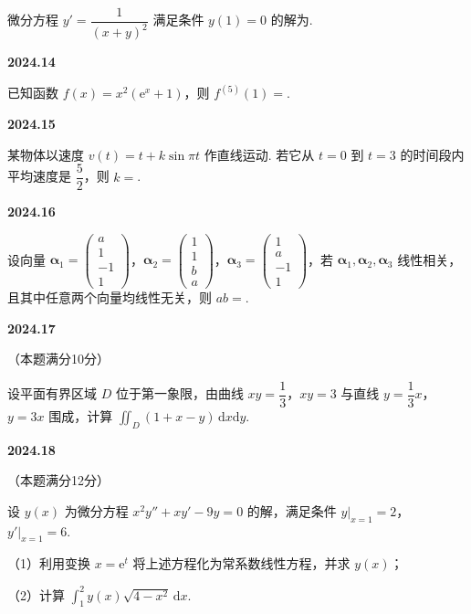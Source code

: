 \documentclass[UTF8,12pt,fontset=windows]{ctexart}
\begin{document}
微分方程 $y'=\dfrac{1}{(x+y)^2}$ 满足条件 $y(1)=0$ 的解为\underline{\hspace{20mm}}.

\vfill
\newpage
{\large\bfseries 2024.14}

已知函数 $f(x)=x^2(\mathrm{e}^x+1)$，则 $f^{(5)}(1)=$\underline{\hspace{20mm}}.

\vfill
\newpage
{\large\bfseries 2024.15}

某物体以速度 $v(t)=t+k\sin\pi t$ 作直线运动. 若它从 $t=0$ 到 $t=3$ 的时间段内平均速度是 $\dfrac{5}{2}$，则 $k=$\underline{\hspace{20mm}}.

\vfill
\newpage
{\large\bfseries 2024.16}

设向量 $\boldsymbol{\alpha}_1=\begin{pmatrix}a\\1\\-1\\1\end{pmatrix}$，$\boldsymbol{\alpha}_2=\begin{pmatrix}1\\1\\b\\a\end{pmatrix}$，$\boldsymbol{\alpha}_3=\begin{pmatrix}1\\a\\-1\\1\end{pmatrix}$，若 $\boldsymbol{\alpha}_1,\boldsymbol{\alpha}_2,\boldsymbol{\alpha}_3$ 线性相关，且其中任意两个向量均线性无关，则 $ab=$\underline{\hspace{20mm}}.

\vfill
\newpage
{\large\bfseries 2024.17}

（本题满分10分）

设平面有界区域 $D$ 位于第一象限，由曲线 $xy=\dfrac{1}{3}$，$xy=3$ 与直线 $y=\dfrac{1}{3}x$，$y=3x$ 围成，计算 $\iint_D(1+x-y)\,\mathrm{d}x\mathrm{d}y$.

\vfill
\newpage
{\large\bfseries 2024.18}

（本题满分12分）

设 $y(x)$ 为微分方程 $x^2y''+xy'-9y=0$ 的解，满足条件 $y\Big|_{x=1}=2$，$y'\Big|_{x=1}=6$.

（1）利用变换 $x=\mathrm{e}^t$ 将上述方程化为常系数线性方程，并求 $y(x)$；

（2）计算 $\int_1^2 y(x)\sqrt{4-x^2}\,\mathrm{d}x$.
\end{document}
